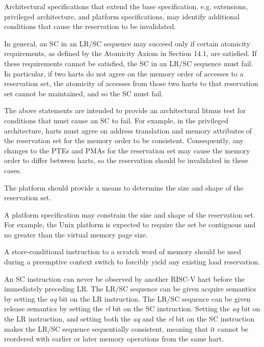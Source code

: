 Architectural specifications that extend the base specification, e.g.
extensions, privileged architecture, and platform specifications, may identify
additional conditions that cause the reservation to be invalidated.

In general, an SC in an LR/SC sequence may succeed only if certain atomicity
requirements, as defined by the Atomicity Axiom in Section 14.1, are satisfied.
If these requirements cannot be satisfied, the SC in an LR/SC sequence must
fail. In particular, if two harts do not agree on the memory order of accesses
to a reservation set, the atomicity of accesses from those two harts to that
reservation set cannot be maintained, and so the SC must fail.

\begin{commentary}
The above statements are intended to provide an architectural litmus test for
conditions that must cause an SC to fail. For example, in the privileged
architecture, harts must agree on address translation and memory attributes of
the reservation set for the memory order to be consistent. Consequently, any
changes to the PTEs and PMAs for the reservation set may cause the memory order
to differ between harts, so the reservation should be invalidated in these
cases.
\end{commentary}

\begin{commentary}
The platform should provide a means to determine the size and shape of the
reservation set.

A platform specification may constrain the size and shape of the reservation
set.  For example, the Unix platform is expected to require the set be
contiguous and no greater than the virtual memory page size.
\end{commentary}

\begin{commentary}
A store-conditional instruction to a scratch word of memory should be used
during a preemptive context switch to forcibly yield any existing load
reservation.
\end{commentary}

An SC instruction can never be observed by another RISC-V hart
before the immediately preceding LR.
The LR/SC
sequence can be given acquire semantics by setting the {\em aq} bit on
the LR instruction.  The LR/SC sequence can be given release semantics
by setting the {\em rl} bit on the SC instruction.  Setting the {\em
  aq} bit on the LR instruction, and setting both the {\em aq} and the {\em
  rl} bit on the SC instruction makes the LR/SC sequence sequentially
consistent, meaning that it cannot be reordered with earlier or
later memory operations from the same hart.

